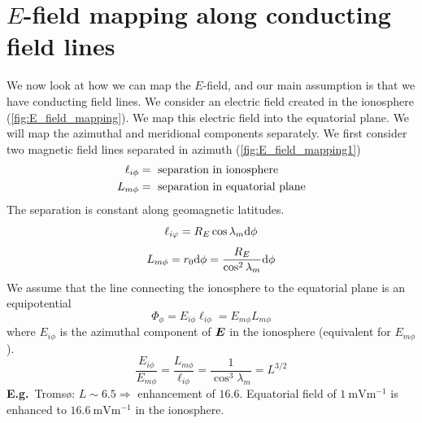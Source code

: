 \section{\(E\)-field mapping along conducting field lines}
We now look at how we can map the \(E\)-field, and our main assumption is that we have conducting field lines. We consider an electric field created in the ionosphere (\cref{fig:E_field_mapping}). We map this electric field into the equatorial plane. We will map the azimuthal and meridional components separately. We first consider two magnetic field lines separated in azimuth (\cref{fig:E_field_mapping1})
\begin{align*}
    \ell_{i\phi}&=\textnormal{ separation in ionosphere}\\
    L_{m\phi}&=\textnormal{ separation in equatorial plane}
\end{align*}
The separation is constant along geomagnetic latitudes.
\begin{equation*}
    \ell_{i\varphi}=R_E\cos\lambda_m\textnormal{d}\phi
\end{equation*}
\begin{equation*}
    L_{m\phi}=r_0\textnormal{d}\phi=\frac{R_E}{\cos^2\lambda_m}\textnormal{d}\phi
\end{equation*}
We assume that the line connecting the ionosphere to the equatorial plane is an equipotential
\begin{equation*}
    \Phi_\phi=E_{i\phi}\ell_{i\phi}=E_{m\phi}L_{m\phi}
\end{equation*}
where \(E_{i\phi}\) is the azimuthal component of \(\boldsymbol{E}\) in the ionosphere (equivalent for \(E_{m\phi}\)).
\begin{equation*}
    \frac{E_{i\phi}}{E_{m\phi}}=\frac{L_{m\phi}}{\ell_{i\phi}}=\frac{1}{\cos^3\lambda_m}=L^{3/2}
\end{equation*}
\textbf{E.g.}\ Tromsø: \(L\sim 6.5\Rightarrow \) enhancement of \(16.6\). Equatorial field of \(\SI{1}{\milli\volt\metre^{-1}}\) is enhanced to \(\SI{16.6}{\milli\volt\metre^{-1}}\) in the ionosphere.

